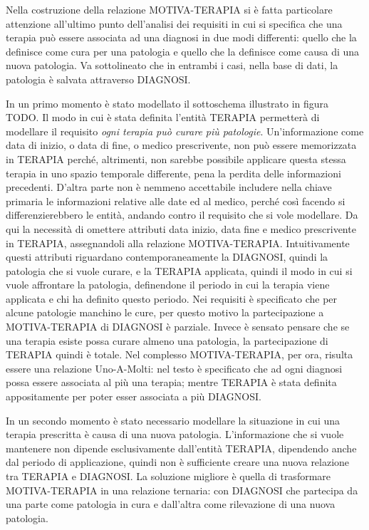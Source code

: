 \documentclass{article}
\begin{document}
                 

Nella costruzione della relazione MOTIVA-TERAPIA si è fatta particolare
attenzione all'ultimo punto dell'analisi dei requisiti in cui si specifica che
una terapia può essere associata ad una diagnosi in due modi differenti: quello
che la definisce come cura per una patologia e quello che la definisce come
causa di una nuova patologia.  Va sottolineato che in entrambi i casi, nella
base di dati, la patologia è salvata attraverso DIAGNOSI.

In un primo momento è stato modellato il sottoschema illustrato in figura TODO.
Il modo in cui è stata definita l'entità TERAPIA permetterà di modellare il
requisito \textit{ogni terapia può curare più patologie}.  Un'informazione come
data di inizio, o data di fine, o medico prescrivente, non può essere
memorizzata in TERAPIA perché, altrimenti, non sarebbe possibile applicare
questa stessa terapia in uno spazio temporale differente, pena la perdita delle
informazioni precedenti. D'altra parte non è nemmeno accettabile includere
nella chiave primaria le informazioni relative alle date ed al medico, perché
così facendo si differenzierebbero le entità, andando contro il requisito che
si vole modellare.  Da qui la necessità di omettere attributi data inizio, data
fine e medico prescrivente in TERAPIA, assegnandoli alla relazione
MOTIVA-TERAPIA.  Intuitivamente questi attributi riguardano contemporaneamente
la DIAGNOSI, quindi la patologia che si vuole curare, e la TERAPIA applicata,
quindi il modo in cui si vuole affrontare la patologia, definendone il periodo
in cui la terapia viene applicata e chi ha definito questo periodo.  Nei
requisiti è specificato che per alcune patologie manchino le cure, per questo
motivo la partecipazione a MOTIVA-TERAPIA di DIAGNOSI è parziale.  Invece è
sensato pensare che se una terapia esiste possa curare almeno una patologia, la
partecipazione di TERAPIA quindi è totale.  Nel complesso MOTIVA-TERAPIA, per
ora, risulta essere una relazione Uno-A-Molti: nel testo è specificato che ad
ogni diagnosi possa essere associata al più una terapia; mentre TERAPIA è stata
definita appositamente per poter esser associata a più DIAGNOSI.

In un secondo momento è stato necessario modellare la situazione in cui una 
terapia prescritta è causa di una nuova patologia.  L'informazione che si vuole
mantenere non dipende esclusivamente dall'entità TERAPIA, dipendendo anche dal 
periodo di applicazione, quindi non è sufficiente creare una nuova relazione 
tra TERAPIA e DIAGNOSI.  La soluzione migliore è quella di trasformare 
MOTIVA-TERAPIA in una relazione ternaria: con DIAGNOSI che partecipa da una 
parte come patologia in cura e dall'altra come rilevazione di una nuova 
patologia.
\end{document}
